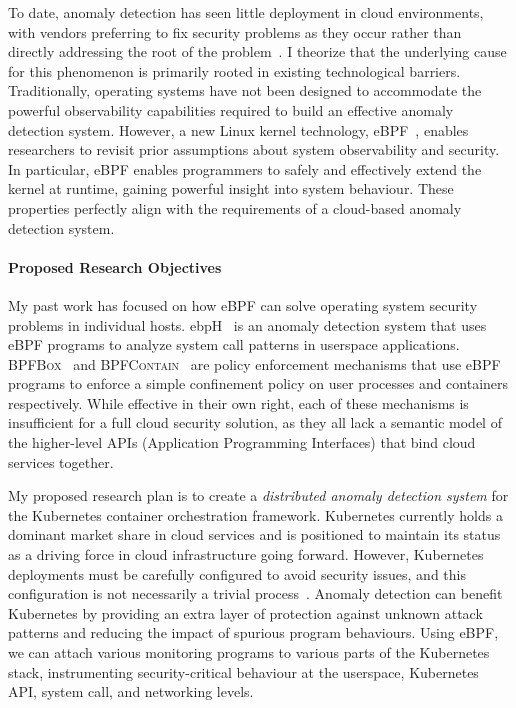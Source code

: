 To date, anomaly detection has seen little deployment in cloud environments, with vendors preferring to fix security problems as they occur rather than directly addressing the root of the problem~\cite{shamim2020_commandments}. I theorize that the underlying cause for this phenomenon is primarily rooted in existing technological barriers. Traditionally, operating systems have not been designed to accommodate the powerful observability capabilities required to build an effective anomaly detection system. However, a new Linux kernel technology, eBPF~\cite{starovoitov2014_ebpf}, enables researchers to revisit prior assumptions about system observability and security. In particular, eBPF enables programmers to safely and effectively extend the kernel at runtime, gaining powerful insight into system behaviour. These properties perfectly align with the requirements of a cloud-based anomaly detection system.

\paragraph*{Proposed Research Objectives}

My past work has focused on how eBPF can solve operating system security problems in individual hosts. ebpH~\cite{findlay2020_ebph} is an anomaly detection system that uses eBPF programs to analyze system call patterns in userspace applications. \textsc{BPFBox}~\cite{findlay2020_bpfbox, findlay2021_confinement} and \textsc{BPFContain}~\cite{findlay2021_bpfcontain, findlay2021_confinement} are policy enforcement mechanisms that use eBPF programs to enforce a simple confinement policy on user processes and containers respectively. While effective in their own right, each of these mechanisms is insufficient for a full cloud security solution, as they all lack a semantic model of the higher-level APIs (Application Programming Interfaces) that bind cloud services together.

My proposed research plan is to create a \textit{distributed anomaly detection system} for the Kubernetes container orchestration framework. Kubernetes currently holds a dominant market share in cloud services and is positioned to maintain its status as a driving force in cloud infrastructure going forward. However, Kubernetes deployments must be carefully configured to avoid security issues, and this configuration is not necessarily a trivial process~\cite{shamim2020_commandments}. Anomaly detection can benefit Kubernetes by providing an extra layer of protection against unknown attack patterns and reducing the impact of spurious program behaviours. Using eBPF, we can attach various monitoring programs to various parts of the Kubernetes stack, instrumenting security-critical behaviour at the userspace, Kubernetes API, system call, and networking levels.

